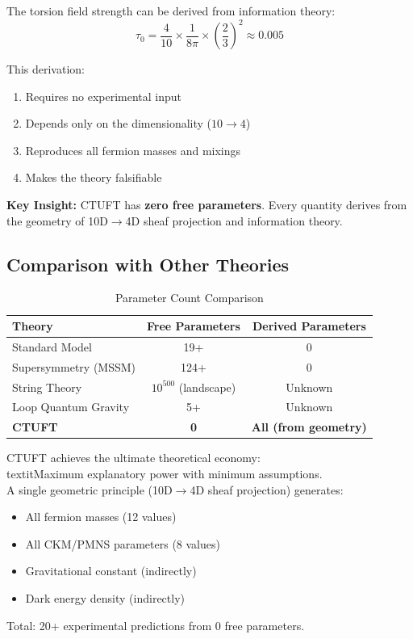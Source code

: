 \begin{theorem}
The torsion field strength can be derived from information theory:
\begin{equation}
    \tau_0 = \frac{4}{10} \times \frac{1}{8\pi} \times \left(\frac{2}{3}\right)^2 \approx 0.005
\end{equation}

This derivation:
\begin{enumerate}
    \item Requires no experimental input
    \item Depends only on the dimensionality ($10 \to 4$)
    \item Reproduces all fermion masses and mixings
    \item Makes the theory falsifiable
\end{enumerate}
\end{theorem}

\textbf{Key Insight:} CTUFT has \textbf{zero free parameters}. Every quantity derives from the geometry of 10D$\to$4D sheaf projection and information theory.

\subsection{Comparison with Other Theories}

\begin{table}[htbp]
\centering
\caption{Parameter Count Comparison}
\begin{tabular}{@{}lcc@{}}
\toprule
\textbf{Theory} & \textbf{Free Parameters} & \textbf{Derived Parameters} \\
\midrule
Standard Model & 19+ & 0 \\
Supersymmetry (MSSM) & 124+ & 0 \\
String Theory & $10^{500}$ (landscape) & Unknown \\
Loop Quantum Gravity & 5+ & Unknown \\
\midrule
\textbf{CTUFT} & \textbf{0} & \textbf{All (from geometry)} \\
\bottomrule
\end{tabular}
\label{tab:parameter_count}
\end{table}

\begin{remark}
CTUFT achieves the ultimate theoretical economy:\\textit{Maximum explanatory power with minimum assumptions.}\\A single geometric principle (10D$\to$4D sheaf projection) generates:\begin{itemize}
    \item All fermion masses (12 values)
    \item All CKM/PMNS parameters (8 values)
    \item Gravitational constant (indirectly)
    \item Dark energy density (indirectly)
\end{itemize}
Total: 20+ experimental predictions from 0 free parameters.
\end{remark}
